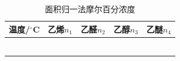 \documentclass[a4paper]{article}
\begin{document}
\begin{table}[H]
	\begin{center}
		\begin{tabular}{l|l|l|l|l}
			\hline
			温度/$^\circ$C &乙烯$n_{1}$  &乙醛$n_{2}$    &乙醇$n_{3}$   &乙醚$n_{4}$ \\ 
			\hline
			&             &          &             & \\
			\hline
			&             &          &             & \\
			\hline
			&             &          &             & \\
			\hline
			&             &          &             & \\
			\hline
			&             &          &             & \\
			\hline
			&             &          &             & \\
			\hline
		 \end{tabular}
	\end{center}
	\caption{面积归一法摩尔百分浓度}
\end{table}
\end{document}
